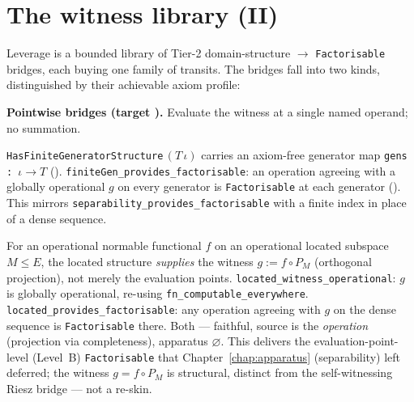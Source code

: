 \section{The witness library (II)}
\label{sec:transit_library}

Leverage is a bounded library of Tier-2 domain-structure $\to$
\texttt{Factorisable} bridges, each buying one family of transits.  The bridges
fall into two kinds, distinguished by their achievable axiom profile:

\textbf{Pointwise bridges (target \axiomprofile{[]}).}  Evaluate the witness at a
single named operand; no summation.

\begin{theorem}
\label{thm:transit_finiteGen}
\leanok
{}
\texttt{HasFiniteGeneratorStructure}\,$(T\,\iota)$ carries an axiom-free generator
map \texttt{gens : $\iota \to T$} (\axiomprofile{[]}).
\texttt{finiteGen\_provides\_factorisable}: an operation agreeing with a globally
operational $g$ on every generator is \texttt{Factorisable} at each generator
(\axiomprofile{[]}).  This mirrors \texttt{separability\_provides\_factorisable}
with a finite index in place of a dense sequence.
\end{theorem}

\begin{theorem}
\label{thm:transit_located}
\leanok
{}
For an operational normable functional $f$ on an operational located subspace
$M \le E$, the located structure \emph{supplies} the witness $g := f \circ P_M$
(orthogonal projection), not merely the evaluation points.
\texttt{located\_witness\_operational}: $g$ is globally operational, re-using
\texttt{fn\_computable\_everywhere}.  \texttt{located\_provides\_factorisable}: any
operation agreeing with $g$ on the dense sequence is \texttt{Factorisable} there.
Both  --- faithful, source is
the \emph{operation} (projection via completeness), apparatus $\varnothing$.  This
delivers the evaluation-point-level (Level~B) \texttt{Factorisable} that
Chapter~\ref{chap:apparatus} (separability) left deferred; the witness $g = f\circ
P_M$ is structural, distinct from the self-witnessing Riesz bridge --- not a
re-skin.
\end{theorem}

